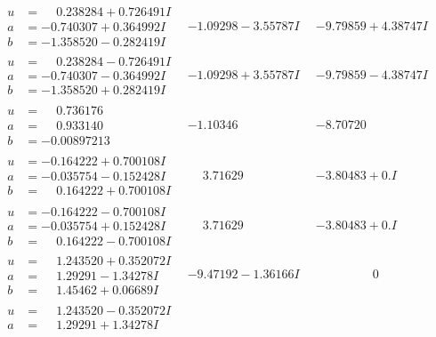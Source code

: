 \documentclass[1p]{elsarticle_modified}
\theoremstyle{definition}
\begin{document}
$$\begin{array}{c|c|c}
\begin{aligned}
u &= \phantom{-}0.238284 + 0.726491 I \\
a &= -0.740307 + 0.364992 I \\
b &= -1.358520 - 0.282419 I\end{aligned}
 & -1.09298 - 3.55787 I & -9.79859 + 4.38747 I \\ \hline\begin{aligned}
u &= \phantom{-}0.238284 - 0.726491 I \\
a &= -0.740307 - 0.364992 I \\
b &= -1.358520 + 0.282419 I\end{aligned}
 & -1.09298 + 3.55787 I & -9.79859 - 4.38747 I \\ \hline\begin{aligned}
u &= \phantom{-}0.736176\phantom{ +0.000000I} \\
a &= \phantom{-}0.933140\phantom{ +0.000000I} \\
b &= -0.00897213\phantom{ +0.000000I}\end{aligned}
 & -1.10346\phantom{ +0.000000I} & -8.70720\phantom{ +0.000000I} \\ \hline\begin{aligned}
u &= -0.164222 + 0.700108 I \\
a &= -0.035754 - 0.152428 I \\
b &= \phantom{-}0.164222 + 0.700108 I\end{aligned}
 & \phantom{-}3.71629\phantom{ +0.000000I} & -3.80483 + 0. I\phantom{ +0.000000I} \\ \hline\begin{aligned}
u &= -0.164222 - 0.700108 I \\
a &= -0.035754 + 0.152428 I \\
b &= \phantom{-}0.164222 - 0.700108 I\end{aligned}
 & \phantom{-}3.71629\phantom{ +0.000000I} & -3.80483 + 0. I\phantom{ +0.000000I} \\ \hline\begin{aligned}
u &= \phantom{-}1.243520 + 0.352072 I \\
a &= \phantom{-}1.29291 - 1.34278 I \\
b &= \phantom{-}1.45462 + 0.06689 I\end{aligned}
 & -9.47192 - 1.36166 I & \phantom{-0.000000 } 0 \\ \hline\begin{aligned}
u &= \phantom{-}1.243520 - 0.352072 I \\
a &= \phantom{-}1.29291 + 1.34278 I \\

\end{aligned}
\end{array}$$
\end{document}
